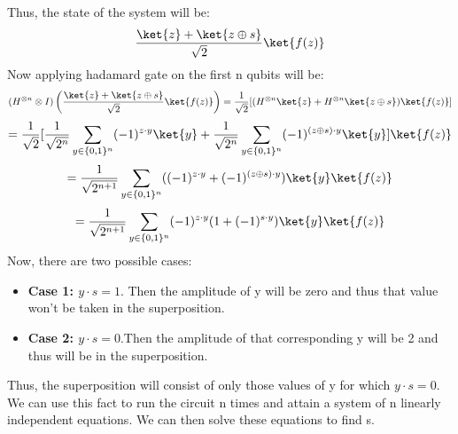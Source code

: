 \documentclass[12pt, oneside]{book}
\theoremstyle{definition}
\theoremstyle{definition}
\theoremstyle{remark}
\begin{document}
Thus, the state of the system will be:
\[
    \frac{\ket{z}+\ket{z\oplus s}}{\sqrt{2}}\ket{f(z)}
\]
Now applying hadamard gate on the first n qubits will be:
\[
    (H^{\otimes n}\otimes I)\left(\frac{\ket{z}+\ket{z\oplus s}}{\sqrt{2}}\ket{f(z)}\right)=\frac{1}{\sqrt{2}}[(H^{\otimes n}\ket{z}+H^{\otimes n}\ket{z\oplus s})\ket{f(z)}]
\]
\[
    =\frac{1}{\sqrt{2}}[\frac{1}{\sqrt{2^n}}\sum_{y \in \{0,1\}^n}(-1)^{z\cdot y}\ket{y}+\frac{1}{\sqrt{2^n}}\sum_{y \in \{0,1\}^n}(-1)^{(z\oplus s)\cdot y}\ket{y}]\ket{f(z)}
\]
\[
    =\frac{1}{\sqrt{2^{n+1}}}\sum_{y \in \{0,1\}^n}((-1)^{z\cdot y}+(-1)^{(z\oplus s) \cdot y})\ket{y}\ket{f(z)}
\]
\[
    =\frac{1}{\sqrt{2^{n+1}}}\sum_{y \in \{0,1\}^n}(-1)^{z\cdot y}(1+(-1)^{s\cdot y})\ket{y}\ket{f(z)}
\]
Now, there are two possible cases:
\begin{itemize}
    \item \textbf{Case 1: $y\cdot s=1$}. Then the amplitude of y will be zero and thus that value won't be taken in the superposition.
    \item \textbf{Case 2: $y\cdot s=0$}.Then the amplitude of that corresponding y will be 2 and thus will be in the superposition.
\end{itemize}
Thus, the superposition will consist of only those values of y for which $y\cdot s=0$.
We can use this fact to run the circuit n times and attain a system of n linearly independent equations. We can then solve these equations to find s.
\end{document}
